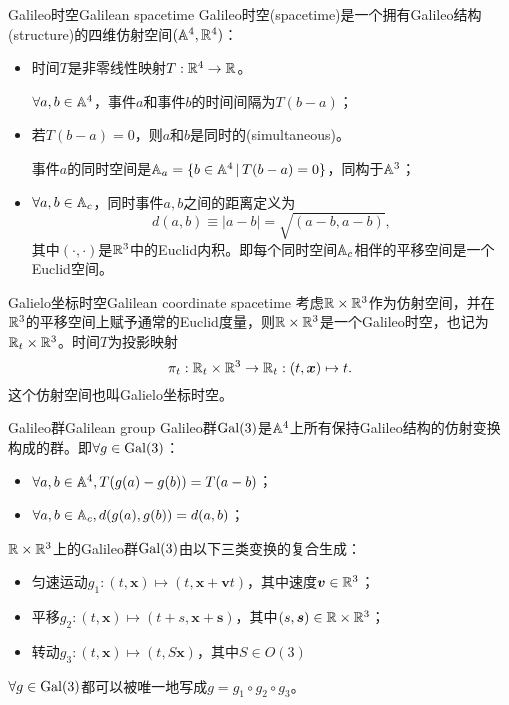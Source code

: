 \begin{definition}{Galileo时空}{Galilean spacetime}
    Galileo时空(spacetime)是一个拥有Galileo结构(structure)的四维仿射空间$(\AA^4,\RR^4)$：
    \begin{itemize}
        \item 时间$T$是非零线性映射$T:\RR^4\to\RR$。
        
        $\forall a,b\in\AA^4$，事件$a$和事件$b$的时间间隔为$T(b-a)$；
        \item 若$T(b-a)=0$，则$a$和$b$是同时的(simultaneous)。
        
        事件$a$的同时空间是$\AA_a=\{b\in\AA^4\,|\,T(b-a)=0\}$，同构于$\AA^3$；
        \item $\forall a,b\in\AA_c$，同时事件$a,b$之间的距离定义为
        \begin{equation}
            d(a,b)\equiv|a-b|=\sqrt{(a-b,a-b)},
        \end{equation}
        其中$(\cdot,\cdot)$是$\RR^3$中的Euclid内积。即每个同时空间$\AA_c$相伴的平移空间是一个Euclid空间。
    \end{itemize}
\end{definition}
\begin{example}{Galielo坐标时空}{Galilean coordinate spacetime}
    考虑$\RR\times\RR^3$作为仿射空间，并在$\RR^3$的平移空间上赋予通常的Euclid度量，则$\RR\times\RR^3$是一个Galileo时空，也记为$\RR_t\times\RR^3$。时间$T$为投影映射
    \begin{equation}
        \pi_t:\RR_t\times\RR^3\to\RR_t:(t,\bm x)\mapsto t.
    \end{equation}
    这个仿射空间也叫Galielo坐标时空。
\end{example}
\begin{definition}{Galileo群}{Galilean group}
    Galileo群$\Gal(3)$是$\AA^4$上所有保持Galileo结构的仿射变换构成的群。即$\forall g\in\Gal(3)$：
    \begin{itemize}
        \item $\forall a,b\in\AA^4,T(g(a)-g(b))=T(a-b)$；
        \item $\forall a,b\in\AA_c,d(g(a),g(b))=d(a,b)$；
    \end{itemize}
\end{definition}
\begin{theorem}{}{}
    $\RR\times\RR^3$上的Galileo群$\Gal(3)$由以下三类变换的复合生成：
    \begin{itemize}
        \item 匀速运动$g_1:(t,\bm x)\mapsto(t,\bm x+\bm vt)$，其中速度$\bm v\in\RR^3$；
        \item 平移$g_2:(t,\bm x)\mapsto(t+s,\bm x+\bm s)$，其中$(s,\bm s)\in\RR\times\RR^3$；
        \item 转动$g_3:(t,\bm x)\mapsto(t,S\bm x)$，其中$S\in O(3)$
    \end{itemize}
    $\forall g\in\Gal(3)$都可以被唯一地写成$g=g_1\circ g_2\circ g_3$。
\end{theorem}
